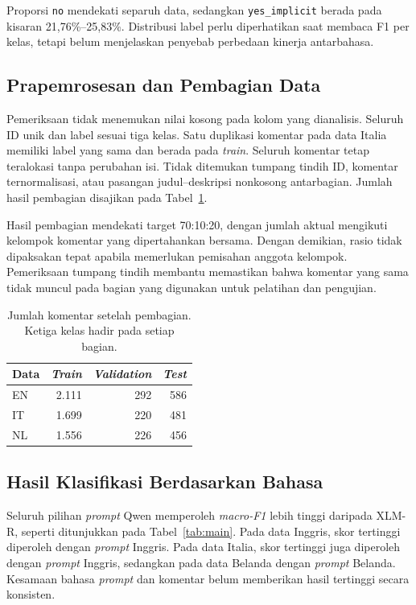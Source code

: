 \documentclass[11pt]{article}
\begin{document}
Proporsi \texttt{no} mendekati separuh data, sedangkan \texttt{yes\_implicit} berada pada kisaran 21,76\%--25,83\%. Distribusi label perlu diperhatikan saat membaca F1 per kelas, tetapi belum menjelaskan penyebab perbedaan kinerja antarbahasa.

\subsection{Prapemrosesan dan Pembagian Data}
Pemeriksaan tidak menemukan nilai kosong pada kolom yang dianalisis. Seluruh ID unik dan label sesuai tiga kelas. Satu duplikasi komentar pada data Italia memiliki label yang sama dan berada pada \textit{train}. Seluruh komentar tetap teralokasi tanpa perubahan isi. Tidak ditemukan tumpang tindih ID, komentar ternormalisasi, atau pasangan judul--deskripsi nonkosong antarbagian. Jumlah hasil pembagian disajikan pada Tabel~\ref{tab:split}.

Hasil pembagian mendekati target 70:10:20, dengan jumlah aktual mengikuti kelompok komentar yang dipertahankan bersama. Dengan demikian, rasio tidak dipaksakan tepat apabila memerlukan pemisahan anggota kelompok. Pemeriksaan tumpang tindih membantu memastikan bahwa komentar yang sama tidak muncul pada bagian yang digunakan untuk pelatihan dan pengujian.

\begin{table}[t]
\centering\small
\begin{tabular}{lrrr}
\toprule
Data & \textit{Train} & \textit{Validation} & \textit{Test} \\
\midrule
EN & 2.111 & 292 & 586 \\
IT & 1.699 & 220 & 481 \\
NL & 1.556 & 226 & 456 \\
\bottomrule
\end{tabular}
\caption{Jumlah komentar setelah pembagian. Ketiga kelas hadir pada setiap bagian.}
\label{tab:split}
\end{table}

\subsection{Hasil Klasifikasi Berdasarkan Bahasa}
Seluruh pilihan \textit{prompt} Qwen memperoleh \textit{macro-F1} lebih tinggi daripada XLM-R, seperti ditunjukkan pada Tabel~\ref{tab:main}. Pada data Inggris, skor tertinggi diperoleh dengan \textit{prompt} Inggris. Pada data Italia, skor tertinggi juga diperoleh dengan \textit{prompt} Inggris, sedangkan pada data Belanda dengan \textit{prompt} Belanda. Kesamaan bahasa \textit{prompt} dan komentar belum memberikan hasil tertinggi secara konsisten.
\end{document}
